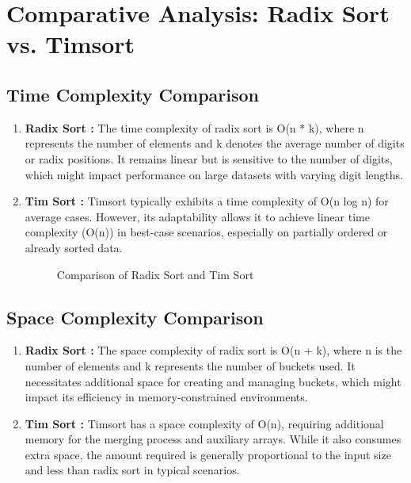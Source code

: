 \documentclass[conference]{IEEEtran}
\begin{document}
\begin{enumerate}
\begin{enumerate}
		  \end{enumerate}
\end{enumerate}

\section{Comparative Analysis: Radix Sort vs. Timsort}
\subsection{Time Complexity Comparison}
\begin{enumerate}
	\item \textbf{Radix Sort : } The time complexity of radix sort is O(n * k), where n represents the number of elements and k denotes the average number of digits or radix positions. It remains linear but is sensitive to the number of digits, which might impact performance on large datasets with varying digit lengths.
	\item \textbf{Tim Sort : } Timsort typically exhibits a time complexity of O(n log n) for average cases. However, its adaptability allows it to achieve linear time complexity (O(n)) in best-case scenarios, especially on partially ordered or already sorted data.
	\begin{figure}
		\centering
		\caption{Comparison of Radix Sort and Tim Sort}
		\label{fig:bar-graph}
	\end{figure}
\end{enumerate}
\subsection{Space Complexity Comparison}
\begin{enumerate}
	\item \textbf{Radix Sort : } The space complexity \cite{2} of radix sort is O(n + k), where n is the number of elements and k represents the number of buckets used. It necessitates additional space for creating and managing buckets, which might impact its efficiency in memory-constrained environments.
	\item \textbf{Tim Sort : } Timsort has a space complexity of O(n), requiring additional memory for the merging process and auxiliary arrays. While it also consumes extra space, the amount required is generally proportional to the input size and less than radix sort in typical scenarios.
\end{enumerate}
\end{document}
